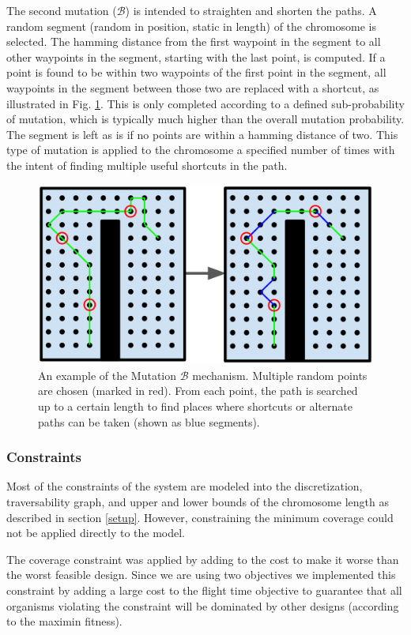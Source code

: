 \documentclass[letterpaper, 10 pt, conference]{ieeeconf}  %
\begin{document}
The second mutation ($\mathcal{B}$) is intended to straighten and shorten the paths. A random segment (random in position, static in length) of the chromosome is selected. The hamming distance from the first waypoint in the segment to all other waypoints in the segment, starting with the last point, is computed. If a point is found to be within two waypoints of the first point in the segment, all waypoints in the segment between those two are replaced with a shortcut, as illustrated in Fig. \ref{fig:muterpolation}. This is only completed according to a defined sub-probability of mutation, which is typically much higher than the overall mutation probability. The segment is left as is if no points are within a hamming distance of two. This type of mutation is applied to the chromosome a specified number of times with the intent of finding multiple useful shortcuts in the path.

\begin{figure}
\centering
\includegraphics[width=0.8\linewidth]{figures/muterpolation.png}
\caption{An example of the Mutation $\mathcal{B}$ mechanism. Multiple random points are chosen (marked in red). From each point, the path is searched up to a certain length to find places where shortcuts or alternate paths can be taken (shown as blue segments).}
\label{fig:muterpolation}
\end{figure}

\subsubsection{Constraints}

Most of the constraints of the system are modeled into the discretization, traversability graph, and upper and lower bounds of the chromosome length as described in section \ref{setup}. However, constraining the minimum coverage could not be applied directly to the model.

The coverage constraint was applied by adding to the cost to make it worse than the worst feasible design. Since we are using two objectives we implemented this constraint by adding a large cost to the flight time objective to guarantee that all organisms violating the constraint will be dominated by other designs (according to the maximin fitness).
\end{document}
